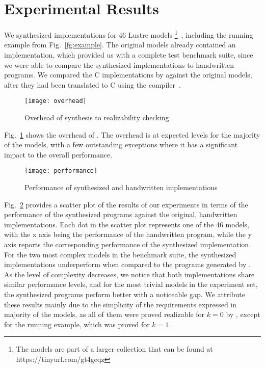 \section{Experimental Results}
\label{sec:experiment}

We synthesized implementations for 46 Lustre models%
\footnote{The models are part of a larger collection
that can be found at
https://tinyurl.com/gt4geqz}~\cite{Hagen08:FMCAD}, including the running example from Fig.~\ref{fg:example}.
 The original models already contained an implementation,
which provided us with a complete test benchmark suite, since we were able to
compare the synthesized implementations to handwritten programs.
We compared the C implementations by \jkindsynt against the original models, after they had been translated
to C using the \lustrev compiler~\cite{lustrev6}.

\begin{figure}[]
	\centering
	\texttt{[image: overhead]}    	
	\caption{Overhead of synthesis to realizability checking}
	\label{fg:overhead}
\end{figure}

Fig.~\ref{fg:overhead} shows the overhead of \jkindsynt. The overhead is at
expected levels for the majority of the models, with a few outstanding
exceptions where it has a significant impact to the overall performance.

\begin{figure}[H]
	\centering
	\texttt{[image: performance]}    	
	\caption{Performance of synthesized and handwritten implementations}
	\label{fg:performance}
\end{figure}

Fig.~\ref{fg:performance} provides a scatter plot of the results of our
experiments in terms of the performance of the synthesized programs against the original, handwritten
implementations. Each dot in the scatter plot represents one of the 46
models, with the x axis being the performance of the handwritten
program, while the y axis reports the corresponding performance of the
synthesized implementation. For the two most complex models in the benchmark
suite, the synthesized implementations underperform when compared to the
programs generated by \lustrev. As the level of complexity decreases, we notice
that both implementations share similar performance levels, and for the most
trivial models in the experiment set, the synthesized programs perform better
with a noticeable gap. We attribute these results mainly due to the
simplicity of the requirements expressed in majority of the models, as all of
them were proved realizable for $k=0$ by \jkind, except for the running example, which was proved for $k=1$.


